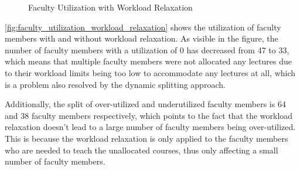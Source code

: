 \begin{figure}[H]
  \centering
  \caption{Faculty Utilization with Workload Relaxation}
  \label{fig:faculty_utilization_workload_relaxation}
\end{figure}

\autoref{fig:faculty_utilization_workload_relaxation} shows the utilization of faculty members with and without workload relaxation. As visible in the figure, the number of faculty members with a utilization of 0 has decreased from 47 to 33, which means that multiple faculty members were not allocated any lectures due to their workload limits being too low to accommodate any lectures at all, which is a problem also resolved by the dynamic splitting approach.

Additionally, the split of over-utilized and underutilized faculty members is 64 and 38 faculty members respectively, which points to the fact that the workload relaxation doesn't lead to a large number of faculty members being over-utilized. This is because the workload relaxation is only applied to the faculty members who are needed to teach the unallocated courses, thus only affecting a small number of faculty members.


